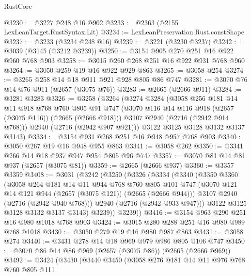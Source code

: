 \begin{lexlean}{RustCore}
\begin{coremodule}
@3230 := @3227 @248 @16 @902
@3233 := @2363 (@2155 LexLeanTarget.RustSyntax.Lit)
@3234 := LexLeanPreservation.Rust.constShape
@3237 := @3233 (@3234 @248 @16)
@3239 := @3221 (@3230 @3237)
@3242 := @3039 (@3145 (@3212 @3239))
@3250 := @3154 @905 @270 @251 @16 @922 @960 @768 @903
@3258 := @3015 @260 @268 @251 @16 @922 @931 @768 @960
@3264 := @3050 @259 @19 @16 @922 @929 @863
@3265 := @3058 @254
@3274 := @3265 @258 @14 @18 @911 @921 @928 @805 @86 @747
@3281 := @3070 @76 @14 @76 @911 (@2657 (@3075 @76))
@3283 := @2665 (@2666 @911)
@3284 := @3281 @3283
@3326 := @3258
    (@3264
      (@3274
        @3284
        (@3058
          @256
          @181
          @14
          @11
          @918
          @768
          @760
          @805
          @91
          @747
          (@3070 @116 @14 @116 @918 (@2657 (@3075 @116)) (@2665 (@2666 @918)))
          @3107
          @2940
          (@2716 (@2942 @914 @768)))
        @2940
        (@2716 (@2942 @907 @921)))
      @3122
      @3125
      @3128
      @3132
      @3137
      @3143)
@3334 := @3154 @931 @268 @251 @16 @948 @957 @768 @903
@3340 := @3050 @267 @19 @16 @948 @955 @863
@3341 := @3058 @262
@3350 := @3341 @266 @14 @18 @937 @947 @954 @805 @96 @747
@3357 := @3070 @81 @14 @81 @937 (@2657 (@3075 @81))
@3359 := @2665 (@2666 @937)
@3360 := @3357 @3359
@3408 := @3031
    (@3242
      (@3250
        (@3326
          (@3334
            (@3340
              (@3350
                @3360
                (@3058
                  @264
                  @181
                  @14
                  @11
                  @944
                  @768
                  @760
                  @805
                  @101
                  @747
                  (@3070 @121 @14 @121 @944 (@2657 (@3075 @121)) (@2665 (@2666 @944)))
                  @3107
                  @2940
                  (@2716 (@2942 @940 @768)))
                @2940
                (@2716 (@2942 @933 @947)))
              @3122
              @3125
              @3128
              @3132
              @3137
              @3143)
            @3239))
        @3239))
@3416 := @3154 @963 @290 @251 @16 @980 @1018 @768 @903
@3424 := @3015 @280 @288 @251 @16 @980 @989 @768 @1018
@3430 := @3050 @279 @19 @16 @980 @987 @863
@3431 := @3058 @274
@3440 := @3431 @278 @14 @18 @969 @979 @986 @805 @106 @747
@3450 := @3070 @86 @14 @86 @969 (@2657 (@3075 @86)) (@2665 (@2666 @969))
@3492 := @3424
    (@3430
      (@3440
        @3450
        (@3058
          @276
          @181
          @14
          @11
          @976
          @768
          @760
          @805
          @111

\end{coremodule}
\end{lexlean}

